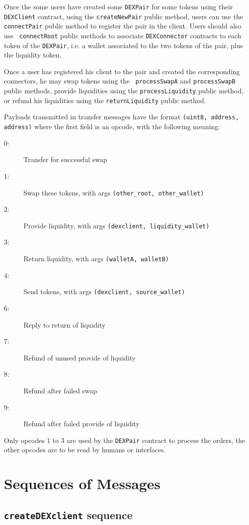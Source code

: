 Once the some users have created some {\tt DEXPair} for some tokens
using their {\tt DEXClient} contract, using the {\tt createNewPair}
public method, users can use the {\tt connectPair} public method to
register the pair in the client. Users should also use {\tt
  connectRoot} public methods to associate {\tt DEXConnector}
contracts to each token of the {\tt DEXPair}, i.e. a wallet associated
to the two tokens of the pair, plus the liquidity token.

Once a user has registered his client to the pair and created the
corresponding connectors, he may swap tokens using the {\tt
  processSwapA} and {\tt processSwapB} public methods, provide
liquidities using the {\tt processLiquidity} public method, or refund
his liquidities using the {\tt returnLiquidity} public method.

Payloads transmitted in transfer messages have the format {\tt (uint8,
  address, address)} where the first field is an opcode, with the
following meaning:
\begin{description}
\item[0:] Transfer for successful swap
\item[1:] Swap these tokens, with args {\tt (other\_root, other\_wallet)}
\item[2:] Provide liquidity, with args {\tt (dexclient, liquidity\_wallet)}
\item[3:] Return liquidity, with args {\tt (walletA, walletB)}
\item[4:] Send tokens, with args {\tt (dexclient, source\_wallet)}
\item[6:] Reply to return of liquidity
\item[7:] Refund of unused provide of liquidity
\item[8:] Refund after failed swap
\item[9:] Refund after failed provide of liquidity
\end{description}

Only opcodes 1 to 3 are used by the {\tt DEXPair} contract to process
the orders, the other opcodes are to be read by humans or interfaces.

\section{Sequences of Messages}

\subsection{{\tt createDEXclient} sequence}

